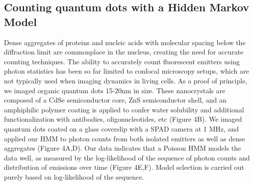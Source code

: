\documentclass{ucetd}
\begin{document}
\subsection{Counting quantum dots with a Hidden Markov Model}

Dense aggregates of proteins and nucleic acids with molecular spacing below the diffraction limit are commonplace in the nucleus, creating the need for accurate counting techniques. The ability to accurately count fluorescent emitters using photon statistics has been so far limited to confocal microscopy setups, which are not typically used when imaging dynamics in living cells. As a proof of principle, we imaged organic quantum dots 15-20nm in size. These nanocrystals are composed of a CdSe semiconductor core, ZnS semiconductor shell, and an amphiphilic polymer coating is applied to confer water solubility and additional functionalization with antibodies, oligonucleotides, etc (Figure 4B). We imaged quantum dots coated on a glass coverslip with a SPAD camera at 1 MHz, and applied our HMM to photon counts from both isolated emitters as well as dense aggregates (Figure 4A,D). Our data indicates that a Poisson HMM models the data well, as measured by the log-likelihood of the sequence of photon counts and distribution of emissions over time (Figure 4E,F). Model selection is carried out purely based on log-likelihood of the sequence.

\end{document}
